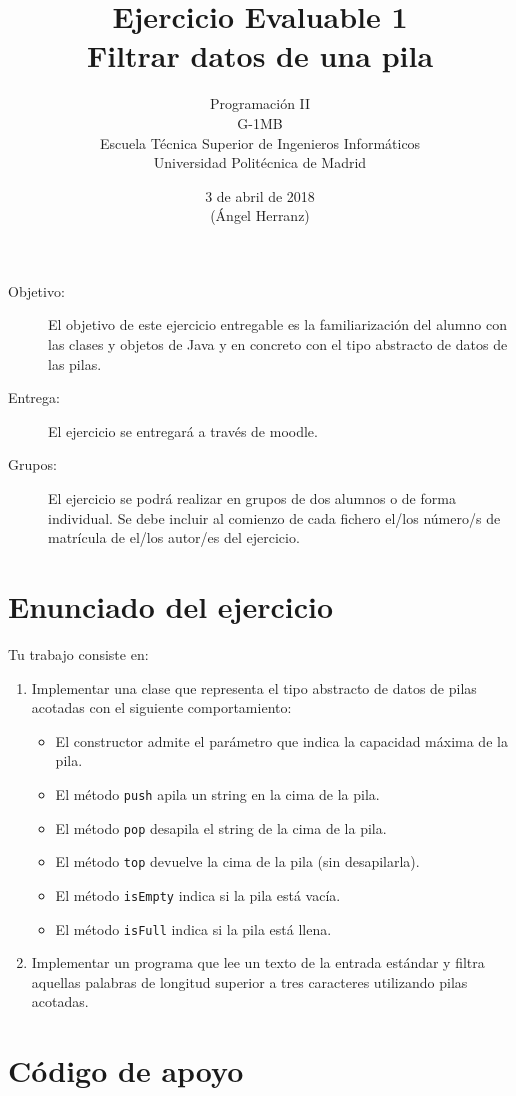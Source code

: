 \documentclass[12pt]{article}
\title{
  Ejercicio Evaluable 1\\
  Filtrar datos de una pila
}
\author{Programación II\\G-1MB\\Escuela Técnica Superior de Ingenieros Informáticos\\Universidad Politécnica de Madrid}
\date{3 de abril de 2018\\\small{(Ángel Herranz)}}
\begin{document}
\maketitle


\begin{description}
\item[Objetivo:] El objetivo de este ejercicio entregable es la familiarización del alumno
  con las clases y objetos de Java y en concreto con el tipo abstracto de datos de las pilas.
\item[Entrega:] El ejercicio se entregará a través de moodle.
\item[Grupos:] El ejercicio se podrá realizar en grupos de dos alumnos o de forma
  individual. Se debe incluir al comienzo de cada fichero el/los número/s de matrícula
  de el/los autor/es del ejercicio.
\end{description}

\section{Enunciado del ejercicio}

Tu trabajo consiste en:
\begin{enumerate}
\item Implementar una clase que representa el tipo abstracto de datos de pilas acotadas con el siguiente comportamiento:
  \begin{itemize}
  \item El constructor admite el parámetro que indica la capacidad máxima de la pila.
  \item El método \lstinline{push} apila un string en la cima de la pila.
  \item El método \lstinline{pop} desapila el string de la cima de la pila.
  \item El método \lstinline{top} devuelve la cima de la pila (sin desapilarla).
  \item El método \lstinline{isEmpty} indica si la pila está vacía.
  \item El método \lstinline{isFull} indica si la pila está llena.
  \end{itemize}
\item Implementar un programa que lee un texto de la entrada estándar
  y filtra aquellas palabras de longitud superior a tres caracteres
  utilizando pilas acotadas.
\end{enumerate}

\section{Código de apoyo}
\end{document}
